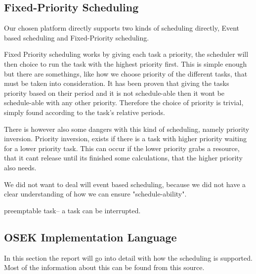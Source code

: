 







\subsection{\textbf{Fixed-Priority Scheduling}}\label{prioratySch}
Our chosen platform directly supports two kinds of scheduling directly, Event based scheduling and Fixed-Priority scheduling\cite{OILManual}.

Fixed Priority scheduling works by giving each task a priority, the scheduler will then choice to run the task with the highest priority first. This is simple enough but there are somethings, like how we choose priority of the different tasks,  that must be taken into consideration. It has been proven that giving the tasks priority based on their period and it is not schedule-able then it wont be schedule-able with any other priority. Therefore the choice of priority is trivial, simply found according to the task's relative periods.

There is however also some dangers with this kind of scheduling, namely priority inversion. Priority inversion, exists if there is a task with higher priority waiting for a lower priority task. This can occur if the lower priority grabs a resource, that it cant release until its finished some calculations, that the higher priority also needs. 

We did not want to deal will event based scheduling, because we did not have a clear understanding of how we can ensure "schedule-ability".

preemptable task-- a task can be interrupted.
\subsection{\textbf{OSEK Implementation Language}}\label{OILteo}
In this section the report will go into detail with how the scheduling is supported. Most of the information about this can be found from this source\cite{OILManual}.

